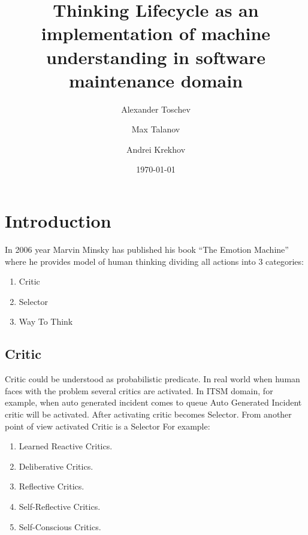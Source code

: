 \documentclass[12pt]{article}
\title{Thinking Lifecycle as an implementation of machine understanding in software maintenance domain}
\author{Alexander Toschev}
\author{Max Talanov}
\author{Andrei Krekhov}
\date{\today}
\begin{document}
\maketitle

\section{Introduction}
In 2006 year Marvin Minsky has published his book “The Emotion Machine” where he provides model of human thinking dividing all actions into 3 categories:

\begin{enumerate}
 \item Critic
 \item Selector
 \item Way To Think
\end{enumerate}

\subsection{Critic}
Critic could be understood as probabilistic predicate. In real world when human faces with the problem several critics are activated. In ITSM domain, for example, when auto generated incident comes to queue Auto Generated Incident critic will be activated. After activating critic becomes Selector. From another point of view activated Critic is a Selector
For example:

\begin{enumerate}
 \item Learned Reactive Critics.
 \item Deliberative Critics.
 \item Reflective Critics.
 \item Self-Reflective Critics.
 \item Self-Conscious Critics.
\end{enumerate}
\end{document}
